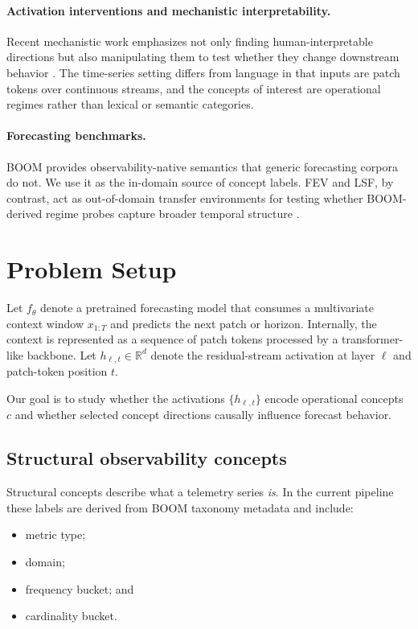 \documentclass{article}
\newcommand{\boom}{\textsc{BOOM}}
\newcommand{\fev}{\textsc{FEV}}
\newcommand{\lsf}{\textsc{LSF}}
\newcommand{\R}{\mathbb{R}}
\begin{document}
\paragraph{Activation interventions and mechanistic interpretability.}
Recent mechanistic work emphasizes not only finding human-interpretable directions but also manipulating them to test whether they change downstream behavior \citep{turner2024steering, kastner2024mechanistic}. The time-series setting differs from language in that inputs are patch tokens over continuous streams, and the concepts of interest are operational regimes rather than lexical or semantic categories.

\paragraph{Forecasting benchmarks.}
\boom{} provides observability-native semantics that generic forecasting corpora do not. We use it as the in-domain source of concept labels. \fev{} and \lsf{}, by contrast, act as out-of-domain transfer environments for testing whether \boom{}-derived regime probes capture broader temporal structure \citep{shchur2025fev, thuml2024tslib}.

\section{Problem Setup}

Let $f_{\theta}$ denote a pretrained forecasting model that consumes a multivariate context window $x_{1:T}$ and predicts the next patch or horizon. Internally, the context is represented as a sequence of patch tokens processed by a transformer-like backbone. Let $h_{\ell,t} \in \R^d$ denote the residual-stream activation at layer $\ell$ and patch-token position $t$.

Our goal is to study whether the activations $\{h_{\ell,t}\}$ encode operational concepts $c$ and whether selected concept directions causally influence forecast behavior.

\subsection{Structural observability concepts}

Structural concepts describe what a telemetry series \emph{is}. In the current pipeline these labels are derived from \boom{} taxonomy metadata and include:
\begin{itemize}[leftmargin=18pt]
\item metric type;
\item domain;
\item frequency bucket; and
\item cardinality bucket.
\end{itemize}
\end{document}
